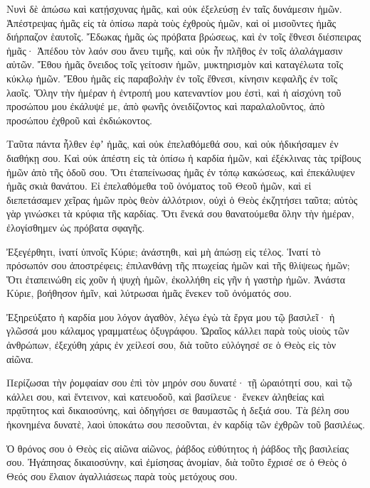 \begin{spacing}{1.1}
\begin{multicols}{2}
Νυνὶ δὲ ἀπώσω καὶ κατῄσχυνας ἡμᾶς, καὶ οὐκ ἐξελεύσῃ ἐν ταῖς δυνάμεσιν ἡμῶν.
Ἀπέστρεψας ἡμᾶς εἰς τὰ ὀπίσω παρὰ τοὺς ἐχθροὺς ἡμῶν, καὶ οἱ μισοῦντες ἡμᾶς διήρπαζον ἑαυτοῖς.
Ἔδωκας ἡμᾶς ὡς πρόβατα βρώσεως, καὶ ἐν τοῖς ἔθνεσι διέσπειρας ἡμᾶς·
Ἀπέδου τὸν λαόν σου ἄνευ τιμῆς, καὶ οὐκ ἦν πλῆθος ἐν τοῖς ἀλαλάγμασιν αὐτῶν.
Ἔθου ἡμᾶς ὄνειδος τοῖς γείτοσιν ἡμῶν, μυκτηρισμὸν καὶ καταγέλωτα τοῖς κύκλῳ ἡμῶν.
Ἔθου ἡμᾶς εἰς παραβολὴν ἐν τοῖς ἔθνεσι, κίνησιν κεφαλῆς ἐν τοῖς λαοῖς.
Ὅλην τὴν ἡμέραν ἡ ἐντροπή μου κατεναντίον μου ἐστὶ, καὶ ἡ αἰσχύνη τοῦ προσώπου μου ἐκάλυψέ με,
ἀπὸ φωνῆς ὀνειδίζοντος καὶ παραλαλοῦντος, ἀπὸ προσώπου ἐχθροῦ καὶ ἐκδιώκοντος.

Ταῦτα πάντα ἦλθεν ἐφʼ ἡμᾶς, καὶ οὐκ ἐπελαθόμεθά σου, καὶ οὐκ ἠδικήσαμεν ἐν διαθήκῃ σου.
Καὶ οὐκ ἀπέστη εἰς τὰ ὀπίσω ἡ καρδία ἡμῶν, καὶ ἐξέκλινας τὰς τρίβους ἡμῶν ἀπὸ τῆς ὁδοῦ σου.
Ὅτι ἐταπείνωσας ἡμᾶς ἐν τόπῳ κακώσεως, καὶ ἐπεκάλυψεν ἡμᾶς σκιὰ θανάτου.
Εἰ ἐπελαθόμεθα τοῦ ὀνόματος τοῦ Θεοῦ ἡμῶν, καὶ εἰ διεπετάσαμεν χεῖρας ἡμῶν πρὸς θεὸν ἀλλότριον,
οὐχὶ ὁ Θεὸς ἐκζητήσει ταῦτα; αὐτὸς γὰρ γινώσκει τὰ κρύφια τῆς καρδίας.
Ὅτι ἕνεκά σου θανατούμεθα ὅλην τὴν ἡμέραν, ἐλογίσθημεν ὡς πρόβατα σφαγῆς.

Ἐξεγέρθητι, ἱνατί ὑπνοῖς Κύριε; ἀνάστηθι, καὶ μὴ ἀπώσῃ εἰς τέλος.
Ἱνατί τὸ πρόσωπόν σου ἀποστρέφεις; ἐπιλανθάνῃ τῆς πτωχείας ἡμῶν καὶ τῆς θλίψεως ἡμῶν;
Ὅτι ἐταπεινώθη εἰς χοῦν ἡ ψυχὴ ἡμῶν, ἐκολλήθη εἰς γῆν ἡ γαστὴρ ἡμῶν.
Ἀνάστα Κύριε, βοήθησον ἡμῖν, καὶ λύτρωσαι ἡμᾶς ἕνεκεν τοῦ ὀνόματός σου.

Ἐξηρεύξατο ἡ καρδία μου λόγον ἀγαθὸν, λέγω ἐγὼ τὰ ἔργα μου τῷ βασιλεῖ· ἡ γλῶσσά μου κάλαμος γραμματέως ὀξυγράφου.
Ὡραῖος κάλλει παρὰ τοὺς υἱοὺς τῶν ἀνθρώπων, ἐξεχύθη χάρις ἐν χείλεσί σου, διὰ τοῦτο εὐλόγησέ σε ὁ Θεὸς εἰς τὸν αἰῶνα.

Περίζωσαι τὴν ῥομφαίαν σου ἐπὶ τὸν μηρόν σου δυνατέ· τῇ ὡραιότητί σου, καὶ τῷ κάλλει σου,
καὶ ἔντεινον, καὶ κατευοδοῦ, καὶ βασίλευε· ἕνεκεν ἀληθείας καὶ πρᾳΰτητος καὶ δικαιοσύνης, καὶ ὁδηγήσει σε θαυμαστῶς ἡ δεξιά σου.
Τὰ βέλη σου ἠκονημένα δυνατὲ, λαοὶ ὑποκάτω σου πεσοῦνται, ἐν καρδίᾳ τῶν ἐχθρῶν τοῦ βασιλέως.

Ὁ θρόνος σου ὁ Θεὸς εἰς αἰῶνα αἰῶνος, ῥάβδος εὐθύτητος ἡ ῥάβδος τῆς βασιλείας σου.
Ἠγάπησας δικαιοσύνην, καὶ ἐμίσησας ἀνομίαν, διὰ τοῦτο ἔχρισέ σε ὁ Θεὸς ὁ Θεός σου ἔλαιον ἀγαλλιάσεως παρὰ τοὺς μετόχους σου.


\end{multicols}
\end{spacing}
